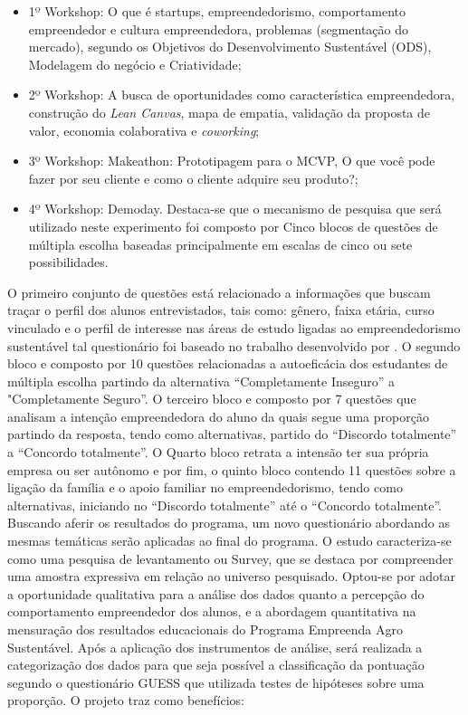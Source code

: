 \begin{itemize}

\item {1º Workshop: O que é startups, empreendedorismo, comportamento empreendedor e cultura empreendedora, problemas (segmentação do mercado), segundo os Objetivos do Desenvolvimento Sustentável (ODS), Modelagem do negócio e Criatividade;}
\item {2º Workshop: A busca de oportunidades como característica empreendedora, construção do \textit{Lean Canvas}, mapa de empatia, validação da proposta de valor, economia colaborativa e \textit{coworking};}

\item {3º Workshop: Makeathon: Prototipagem para o MCVP, O que você pode fazer por seu cliente e como o cliente adquire seu produto?;}
\item {4º Workshop: Demoday. Destaca-se que o mecanismo de pesquisa que será utilizado neste experimento foi composto por Cinco blocos de questões de múltipla escolha baseadas principalmente em escalas de cinco ou sete possibilidades.}
\end{itemize}

O  primeiro conjunto de questões está relacionado a informações que buscam traçar o perfil dos alunos entrevistados, tais como: gênero, faixa etária, curso vinculado e o perfil de interesse nas áreas de estudo ligadas ao empreendedorismo sustentável tal questionário foi baseado no trabalho desenvolvido por . O segundo bloco e composto por 10 questões relacionadas a autoeficácia dos estudantes de múltipla escolha partindo da alternativa “Completamente Inseguro” a "Completamente Seguro”. O terceiro bloco e composto por 7 questões que analisam a intenção empreendedora do aluno da quais segue uma proporção partindo da resposta, tendo como alternativas, partido do “Discordo totalmente” a “Concordo totalmente”. O Quarto bloco retrata a intensão ter sua própria empresa ou ser autônomo e por fim, o quinto bloco contendo 11 questões sobre a ligação da família e o apoio familiar no empreendedorismo, tendo como alternativas, iniciando no “Discordo totalmente” até o “Concordo totalmente”. Buscando aferir os resultados do programa, um novo questionário abordando as mesmas temáticas serão aplicadas ao final do programa. 
O estudo caracteriza-se como uma pesquisa de levantamento ou Survey, que se destaca por compreender uma amostra expressiva em relação ao universo pesquisado. Optou-se por adotar a oportunidade qualitativa para a análise dos dados quanto a percepção do comportamento empreendedor dos alunos, e a abordagem quantitativa na mensuração dos resultados educacionais do Programa Empreenda Agro Sustentável. Após a aplicação dos instrumentos de análise, será realizada a categorização dos dados para que seja possível a classificação da pontuação segundo o questionário GUESS que utilizada testes de hipóteses sobre uma proporção. O projeto traz como benefícios: 

